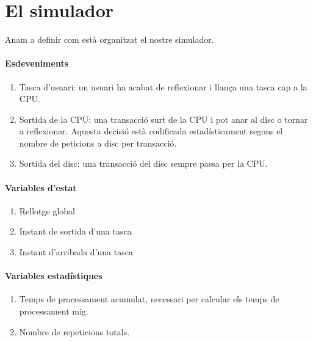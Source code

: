 \section{El simulador}

Anam a definir com està organitzat el nostre simulador.

\paragraph{Esdeveniments}

\begin{enumerate}

  \item Tasca d'usuari: un usuari ha acabat de reflexionar i llança una tasca
    cap a la CPU.

  \item Sortida de la CPU: una transacció surt de la CPU i pot anar al disc o
    tornar a reflexionar. Aquesta decisió està codificada estadísticament
    segons el nombre de peticions a disc per transacció.

  \item Sortida del disc: una transacció del disc sempre passa per la CPU.

\end{enumerate}

\paragraph{Variables d'estat}

\begin{enumerate}

  \item Rellotge global

  \item Instant de sortida d'una tasca

  \item Instant d'arribada d'una tasca

\end{enumerate}

\paragraph{Variables estadístiques}

\begin{enumerate}

  \item Temps de processament acumulat, necessari per calcular els temps de
    processament mig.

  \item Nombre de repeticions totals.

\end{enumerate}

